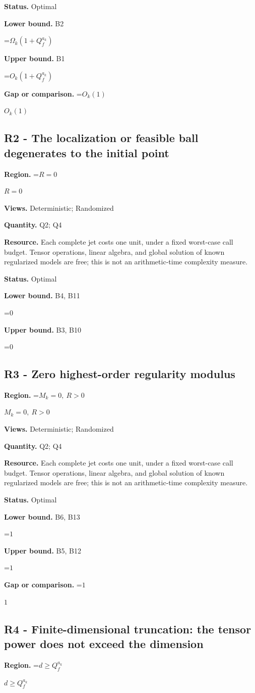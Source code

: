 \documentclass[10pt,a4paper]{article}
\newcommand{\AtlasMath}[1]{\par\begingroup\centering\setbox0=\hbox{$\displaystyle #1$}\ifdim\wd0>1.4\linewidth\typeout{ATLAS WIDE FORMULA: \the\wd0}\fi\ifdim\wd0>\linewidth\resizebox{\linewidth}{!}{\box0}\else\box0\fi\par\endgroup}
\newcommand{\AtlasInlineMath}[1]{\begingroup\setbox0=\hbox{$#1$}\ifdim\wd0>.4\linewidth\endgroup\AtlasMath{#1}\else\endgroup$#1$\fi}
\begin{document}
\textbf{Status.} Optimal

\textbf{Lower bound.} B2

\AtlasMath{\Omega_k(1+Q_f^{a_k})}
\textbf{Upper bound.} B1

\AtlasMath{O_k(1+Q_f^{a_k})}
\textbf{Gap or comparison.} \AtlasInlineMath{O_k(1)}

\subsection{R2 - The localization or feasible ball degenerates to the initial point}
\textbf{Region.} \AtlasInlineMath{R=0}

\textbf{Views.} Deterministic; Randomized

\textbf{Quantity.} Q2; Q4

\textbf{Resource.} Each complete jet costs one unit, under a fixed worst-case call budget. Tensor operations, linear algebra, and global solution of known regularized models are free; this is not an arithmetic-time complexity measure.

\textbf{Status.} Optimal

\textbf{Lower bound.} B4, B11

\AtlasMath{0}
\textbf{Upper bound.} B3, B10

\AtlasMath{0}
\subsection{R3 - Zero highest-order regularity modulus}
\textbf{Region.} \AtlasInlineMath{M_k=0,\ R>0}

\textbf{Views.} Deterministic; Randomized

\textbf{Quantity.} Q2; Q4

\textbf{Resource.} Each complete jet costs one unit, under a fixed worst-case call budget. Tensor operations, linear algebra, and global solution of known regularized models are free; this is not an arithmetic-time complexity measure.

\textbf{Status.} Optimal

\textbf{Lower bound.} B6, B13

\AtlasMath{1}
\textbf{Upper bound.} B5, B12

\AtlasMath{1}
\textbf{Gap or comparison.} \AtlasInlineMath{1}

\subsection{R4 - Finite-dimensional truncation: the tensor power does not exceed the dimension}
\textbf{Region.} \AtlasInlineMath{d\ge Q_f^{a_k}}
\end{document}
